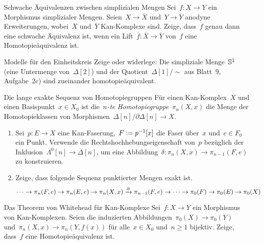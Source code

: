 \documentclass{uebblatt}
\begin{document}

\begin{aufgabe}{Schwache Äquivalenzen zwischen simplizialen Mengen}
Sei~$f : X \to Y$ ein Morphismus simplizialer Mengen. Seien~$X \to
\overline{X}$ und~$Y \to \overline{Y}$ anodyne Erweiterungen,
wobei~$\overline{X}$ und~$\overline{Y}$ Kan-Komplexe sind. Zeige, dass~$f$
genau dann eine schwache Äquivalenz ist, wenn ein Lift~$\overline{f} :
\overline{X} \to \overline{Y}$ von~$f$ eine Homotopieäquivalenz ist.
\end{aufgabe}

\begin{aufgabe}{Modelle für den Einheitskreis}
Zeige oder widerlege: Die simpliziale Menge~$\mathbb{S}^1$ (eine Untermenge
von~$\Delta[2]$) und der Quotient~$\Delta[1]/{\sim}$ aus Blatt~9, Aufgabe~2c)
sind zueinander homotopieäquivalent.
\end{aufgabe}

\begin{aufgabe}{Die lange exakte Sequenz von Homotopiegruppen}
Für einen Kan-Komplex~$X$ und einen Basispunkt~$x \in X_0$ ist die~\emph{$n$-te
Homotopiegruppe}~$\pi_n(X,x)$ die Menge der Homotopieklassen von
Morphismen~$\Delta[n]/\partial \Delta[n] \to X$.
\begin{enumerate}
\item Sei~$p : E \to X$ eine Kan-Faserung,~$F \vcentcolon= p^{-1}[x]$ die Faser
über~$x$ und~$e \in F_0$ ein Punkt. Verwende die Rechtshochhebungseigenschaft
von~$p$ bezüglich der Inklusion~$\Lambda^0[n] \to \Delta[n]$, um eine
Abbildung~$\delta : \pi_n(X,x) \to \pi_{n-1}(F,e)$ zu konstruieren.
\item Zeige, dass folgende Sequenz punktierter Mengen exakt ist.
\[ \cdots \to \pi_n(F,e) \to \pi_n(E,e) \to \pi_n(X,x) \xrightarrow{\partial}
\pi_{n-1}(F,e) \to \cdots \to \pi_0(F) \to \pi_0(E) \to \pi_0(X) \]
\end{enumerate}
\end{aufgabe}
\vspace{-1em}

\begin{aufgabe}{Das Theorem von Whitehead für Kan-Komplexe}
Sei~$f : X \to Y$ ein Morphismus von Kan-Komplexen. Seien die induzierten
Abbildungen~$\pi_0(X) \to \pi_0(Y)$ und~$\pi_n(X,x) \to \pi_n(Y,f(x))$ für
alle~$x \in X_0$ und~$n \geq 1$ bijektiv. Zeige, dass~$f$ eine
Homotopieäquivalenz ist.
\end{aufgabe}
\end{document}
